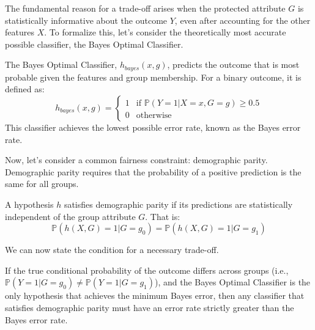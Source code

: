 The fundamental reason for a trade-off arises when the protected attribute $G$ is statistically informative about the outcome $Y$, even after accounting for the other features $X$. To formalize this, let's consider the theoretically most accurate possible classifier, the Bayes Optimal Classifier.

\begin{definition}
The Bayes Optimal Classifier, $h_{bayes}(x, g)$, predicts the outcome that is most probable given the features and group membership. For a binary outcome, it is defined as:
\begin{equation}
h_{bayes}(x, g) = 
\begin{cases} 
1 & \text{if } \mathbb{P}(Y=1 | X=x, G=g) \geq 0.5 \\
0 & \text{otherwise}
\end{cases}
\end{equation}
This classifier achieves the lowest possible error rate, known as the Bayes error rate.
\end{definition}

Now, let's consider a common fairness constraint: demographic parity. Demographic parity requires that the probability of a positive prediction is the same for all groups. 

\begin{definition}
A hypothesis $h$ satisfies demographic parity if its predictions are statistically independent of the group attribute $G$. That is:
\begin{equation}
    \mathbb{P}(h(X,G)=1 | G=g_0) = \mathbb{P}(h(X,G)=1 | G=g_1)
\end{equation}
\end{definition}

We can now state the condition for a necessary trade-off.

\begin{proposition}
If the true conditional probability of the outcome differs across groups (i.e., $\mathbb{P}(Y=1 | G=g_0) \neq \mathbb{P}(Y=1 | G=g_1)$), and the Bayes Optimal Classifier is the only hypothesis that achieves the minimum Bayes error, then any classifier that satisfies demographic parity must have an error rate strictly greater than the Bayes error rate.
\end{proposition}

